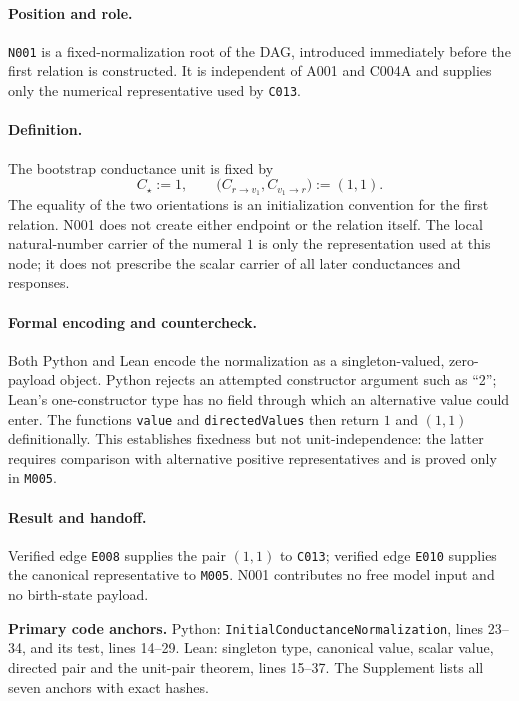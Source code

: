 
\paragraph*{Position and role.}
\texttt{N001} is a fixed-normalization root of the DAG, introduced immediately
before the first relation is constructed.  It is independent of A001 and C004A
and supplies only the numerical representative used by \texttt{C013}.

\paragraph*{Definition.}
The bootstrap conductance unit is fixed by
\begin{equation}
  C_\star:=1,
  \qquad
  \bigl(C_{r\to v_1},C_{v_1\to r}\bigr):=(1,1).
  \label{eq:n001-unit-pair}
\end{equation}
The equality of the two orientations is an initialization convention for the
first relation.  N001 does not create either endpoint or the relation itself.
The local natural-number carrier of the numeral $1$ is only the representation
used at this node; it does not prescribe the scalar carrier of all later
conductances and responses.

\paragraph*{Formal encoding and countercheck.}
Both Python and Lean encode the normalization as a singleton-valued,
zero-payload object.  Python rejects an attempted constructor argument such as
``2''; Lean's one-constructor type has no field through which an alternative
value could enter.  The functions \texttt{value} and \texttt{directedValues}
then return $1$ and $(1,1)$ definitionally.  This establishes fixedness but not
unit-independence: the latter requires comparison with alternative positive
representatives and is proved only in \texttt{M005}.

\paragraph*{Result and handoff.}
Verified edge \texttt{E008} supplies the pair $(1,1)$ to \texttt{C013};
verified edge \texttt{E010} supplies the canonical representative to
\texttt{M005}.  N001 contributes no free model input and no birth-state
payload.

\noindent\textbf{Primary code anchors.}
Python: \texttt{InitialConductanceNormalization}, lines 23--34, and its test,
lines 14--29.  Lean: singleton type, canonical value, scalar value, directed
pair and the unit-pair theorem, lines 15--37.  The Supplement lists all seven
anchors with exact hashes.
